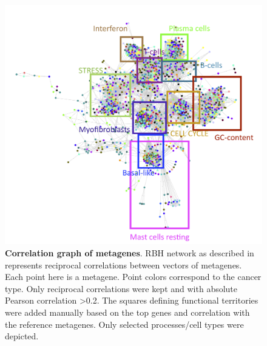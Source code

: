 \documentclass[12pt,]{book}
\theoremstyle{definition}
\theoremstyle{definition}
\theoremstyle{definition}
\theoremstyle{remark}
\begin{document}
\begin{figure}

{\centering \includegraphics[width=1\linewidth]{figures-ext/full_02_recip_color_annot} 

}

\caption[Correlation graph of metagenes]{\textbf{Correlation graph of metagenes}. RBH
network as described in \citep{Cantini2018} represents reciprocal
correlations between vectors of metagenes. Each point here is a
metagene. Point colors correspond to the cancer type. Only reciprocal
correlations were kept and with absolute Pearson correlation
\textgreater{}0.2. The squares defining functional territories were
added manually based on the top genes and correlation with the reference
metagenes. Only selected processes/cell types were depicted.}\label{fig:corrgraphfull}
\end{figure}
\end{document}
